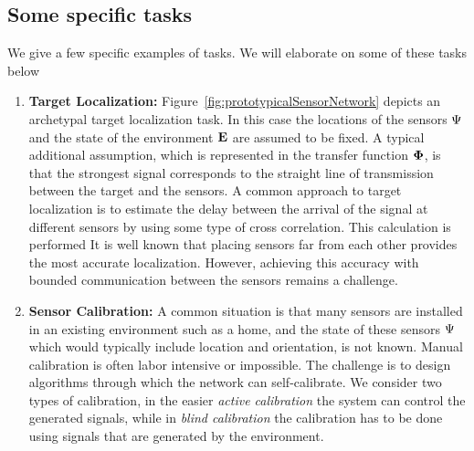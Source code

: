 \subsection{Some specific tasks}\label{sec:examples}
We give a few specific examples of tasks. We will elaborate on some of these tasks below
\begin{enumerate}
    \item {\bf Target Localization:}
      Figure~\ref{fig:prototypicalSensorNetwork} depicts an archetypal
      target localization task. In this case the locations of the
      sensors $\Psi$ and the state of the environment $\mathbf{E}$ are
      assumed to be fixed. A typical additional assumption, which is
      represented in the transfer function $\mathbf{\Phi}$, is that the
      strongest signal corresponds to the straight line of
      transmission between the target and the sensors. A common
      approach to target localization is to estimate the delay between
      the arrival of the signal at different sensors by using some
      type of cross correlation. This calculation is performed  
      It is well known that placing sensors far from each other
      provides the most accurate localization. However, achieving this
      accuracy with bounded communication between the sensors remains
      a challenge.

    \item{\bf Sensor Calibration:} A common situation is that many sensors
      are installed in an existing environment such as a home, and
      the state of these sensors $\Psi$ which would typically
      include location and orientation, is not known. Manual
      calibration is often labor intensive or impossible. The
      challenge is to design algorithms through which the network can
      self-calibrate. We consider two types of calibration, in the
      easier {\em active calibration} the system can control the generated
      signals, while in {\em blind calibration} the calibration has to
      be done using signals that are generated by the environment. 

    

\end{enumerate}
